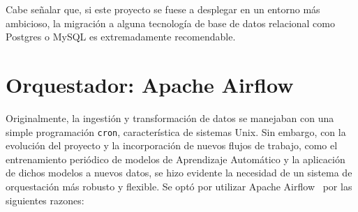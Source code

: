 Cabe señalar que, si este proyecto se fuese a desplegar en un entorno más ambicioso, la migración a alguna tecnología de base de datos relacional como Postgres o MySQL es extremadamente recomendable.

\clearpage
\section{Orquestador: Apache Airflow}\label{sec:airflow_section}

Originalmente, la ingestión y transformación de datos se manejaban con una simple programación \texttt{cron}, característica de sistemas Unix. Sin embargo, con la evolución del proyecto y la incorporación de nuevos flujos de trabajo, como el entrenamiento periódico de modelos de Aprendizaje Automático y la aplicación de dichos modelos a nuevos datos, se hizo evidente la necesidad de un sistema de orquestación más robusto y flexible. Se optó por utilizar Apache Airflow~\cite{airflow} por las siguientes razones:

